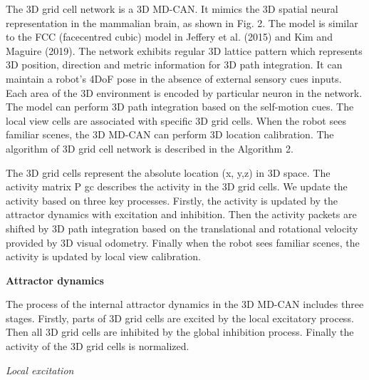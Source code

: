 The 3D grid cell network is a 3D MD-CAN. 
It mimics the 3D spatial neural representation in the mammalian brain, as shown in Fig. 2. 
The model is similar to the FCC (facecentred cubic) model in Jeffery et al. (2015) and Kim and Maguire (2019). 
The network exhibits regular 3D lattice pattern which represents 3D position, direction and metric information for 3D path integration. 
It can maintain a robot's 4DoF pose in the absence of external sensory cues inputs. 
Each area of the 3D environment is encoded by particular neuron in the network. 
The model can perform 3D path integration based on the self-motion cues. 
The local view cells are associated with specific 3D grid cells. 
When the robot sees familiar scenes, the 3D MD-CAN can perform 3D location calibration. 
The algorithm of 3D grid cell network is described in the Algorithm 2.


The 3D grid cells represent the absolute location (x, y,z) in 3D space. 
The activity matrix P gc describes the activity in the 3D grid cells. 
We update the activity based on three key processes. 
Firstly, the activity is updated by the attractor dynamics with excitation and inhibition. 
Then the activity packets are shifted by 3D path integration based on the translational and rotational velocity provided by 3D visual odometry. 
Finally when the robot sees familiar scenes, the activity is updated by local view calibration.


\textbf{Attractor dynamics}

The process of the internal attractor dynamics in the 3D MD-CAN includes three stages. 
Firstly, parts of 3D grid cells are excited by the local excitatory process. 
Then all 3D grid cells are inhibited by the global inhibition process. 
Finally the activity of the 3D grid cells is normalized.

\textit{Local excitation}

